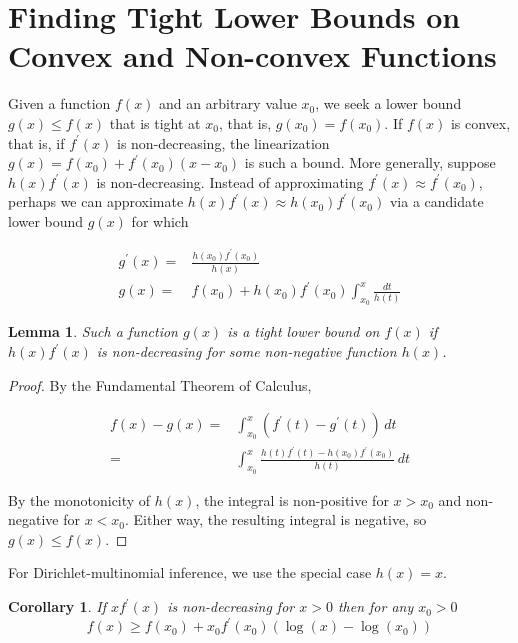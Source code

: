 \documentclass[nofootinbib,amssymb,amsmath]{revtex4}
\newtheorem{lemma}{Lemma}
\newtheorem{corollary}{Corollary}
\begin{document}
\appendix

\section{Finding Tight Lower Bounds on Convex and Non-convex Functions} \label{bounds}

Given a function $f(x)$ and an arbitrary value $x_0$, we seek a lower bound $g(x) \le f(x)$ that is tight at $x_0$, that is, $g(x_0) = f(x_0)$.  If $f(x)$ is convex, that is, if $f^\prime(x)$ is non-decreasing, the linearization $g(x) = f(x_0) + f^\prime(x_0)(x-x_0)$ is such a bound.  More generally, suppose $h(x) f^\prime(x)$ is non-decreasing.  Instead of approximating $f^\prime(x) \approx f^\prime(x_0)$, perhaps we can approximate $h(x) f^\prime(x) \approx h(x_0) f^\prime(x_0)$ via a candidate lower bound $g(x)$ for which

\begin{align}
g^\prime(x) =& \frac{ h(x_0) f^\prime(x_0) } {h(x)} \\
g(x) =& f(x_0) + h(x_0) f^\prime(x_0)  \int_{x_0}^x \frac{d t}{h(t)}
\end{align}

\begin{lemma}
Such a function $g(x)$ is a tight lower bound on $f(x)$ if $h(x) f^\prime(x)$ is non-decreasing for some non-negative function $h(x)$.
\end{lemma}

\begin{proof}
By the Fundamental Theorem of Calculus,

\begin{align}
f(x) - g(x) =& \int_{x_0}^{x} \left( f^\prime(t) - g^\prime(t) \right) \, dt \\
=&  \int_{x_0}^{x} \frac{ h(t) f^\prime(t) - h(x_0) f^\prime(x_0) } {h(t)} \, dt
\end{align}

By the monotonicity of $h(x)$, the integral is non-positive for $x > x_0$ and non-negative for $x < x_0$.  Either way, the resulting integral is negative, so $g(x) \le f(x)$.
\end{proof}

For Dirichlet-multinomial inference, we use the special case $h(x) = x$.

\begin{corollary} 
If $x f^\prime(x)$ is non-decreasing for $x > 0$ then for any $x_0 > 0$
\begin{equation}
f(x) \ge f(x_0) + x_0 f^\prime(x_0) \left( \log(x) - \log(x_0) \right)
\end{equation}
\end{corollary}
\end{document}
